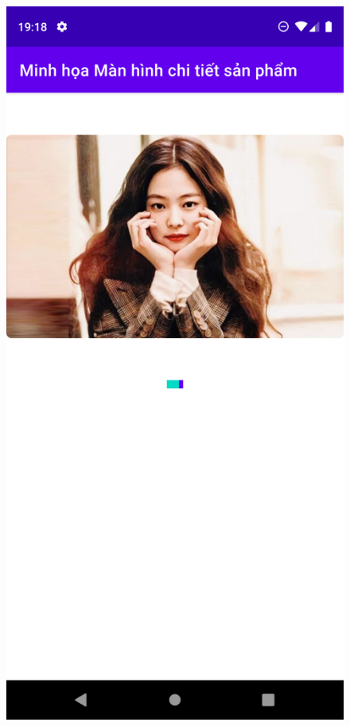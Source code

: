 \documentclass{beamer}
\begin{document}
\begin{frame}
    \begin{columns}
        \begin{figure}
            \centering
            \includegraphics[height=0.7\textheight]{images/37.png}

\end{figure}
\end{columns}
\end{frame}
\end{document}
